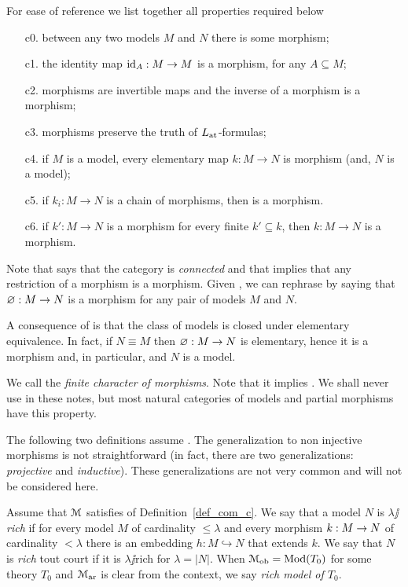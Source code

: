 \documentclass[creche.tex]{subfiles}
\begin{document}
\begin{definition}\label{def_com_c}For ease of reference we list together all properties required below
\begin{itemize} 
\item[c0.] between any two models $M$ and $N$ there is some morphism;
\item[c1.] the identity map $\textrm{id}_A:M\to M$ is a morphism, for any $A\subseteq M$;
\item[c2.] morphisms are invertible maps and the inverse of a morphism is a morphism;
\item[c3.] morphisms preserve the truth of $L_{\tiny\rm at}\hskip-.3ex$\,-formulas;
\item[c4.] if $M$ is a model, every elementary map $k:M\to N$ is morphism (and, $N$ is a model);
\item[c5.] if $k_i:M\to N$ is a chain of morphisms, then  is a morphism.
\item[c6.] if $k':M\to N$ is a morphism for every finite $k'\subseteq k$, then $k:M\to N$ is a morphism.\QED
\end{itemize}
\end{definition}
 
Note that  says that the category is \emph{connected} and that  implies that any restriction of a morphism is a morphism. Given , we can rephrase  by saying that $\varnothing:M\to N$ is a morphism for any pair of models $M$ and $N$. 

A consequence of  is that the class of models is closed under elementary equivalence. In fact, if $N\equiv M$ then $\varnothing:M\to N$ is elementary, hence it is a morphism and, in particular, and $N$ is a model. 

We call  the \emph{finite character of morphisms}. Note that it implies . We shall never use  in these notes, but most natural categories of models and partial morphisms have this property.

The following two definitions assume . The generalization to non injective morphisms is not straightforward (in fact, there are two generalizations: \textit{projective\/} and \textit{inductive\/}). These generalizations are not very common and will not be considered here. 

\begin{definition}
Assume that $\EuScript M$ satisfies  of Definition~\ref{def_com_c}. We say that a model $N$ is \emph{$\lambda\jj$rich\/} if for every model $M$ of cardinality $\le\lambda$ and every morphism $k:M\rightarrow N$ of cardinality $<\lambda$ there is an embedding $h:M\hookrightarrow N$ that extends $k$. We say that $N$ is \emph{rich\/} tout court  if it is $\lambda\jj$rich for $\lambda=|N|$. When $\EuScript M_{\rm ob}=\mathop{\rm Mod}(T_0)$ for some theory $T_0$ and $\EuScript M_{\rm ar}$ is clear from the context, we say \emph{rich model of $T_0$}.\QED
\end{definition}
\end{document}
